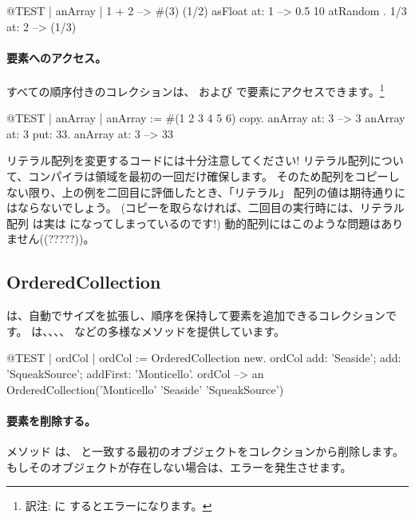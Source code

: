 \documentclass[a4paper,10pt,twoside]{book}
\begin{document}
\begin{code}{@TEST | anArray |}
{ 1 + 2 } --> #(3)
{(1/2) asFloat} at: 1 --> 0.5
{10 atRandom . 1/3} at: 2 --> (1/3)
\end{code}

\paragraph{要素へのアクセス。}
すべての順序付きのコレクションは、 および  で要素にアクセスできます。\footnote{訳注:  に  するとエラーになります。}

\begin{code}{@TEST | anArray |}
anArray := #(1 2 3 4 5 6) copy.
anArray at: 3 --> 3
anArray at: 3 put: 33.
anArray at: 3 --> 33
\end{code}

\noindent
リテラル配列を変更するコードには十分注意してください!
リテラル配列について、コンパイラは領域を最初の一回だけ確保します。
そのため配列をコピーしない限り、上の例を二回目に評価したとき、「リテラル」 配列の値は期待通りにはならないでしょう。
(コピーを取らなければ、二回目の実行時には、リテラル配列  は実は  になってしまっているのです!)
動的配列にはこのような問題はありません((?????))。

\subsection{OrderedCollection}
 は、自動でサイズを拡張し、順序を保持して要素を追加できるコレクションです。 は、、、、 などの多様なメソッドを提供しています。

\begin{code}{@TEST | ordCol |}
ordCol := OrderedCollection new.
ordCol add: 'Seaside'; add: 'SqueakSource'; addFirst: 'Monticello'.
ordCol --> an OrderedCollection('Monticello' 'Seaside' 'SqueakSource')
\end{code}

\paragraph{要素を削除する。} メソッド   は、 と一致する最初のオブジェクトをコレクションから削除します。もしそのオブジェクトが存在しない場合は、エラーを発生させます。
\end{document}
